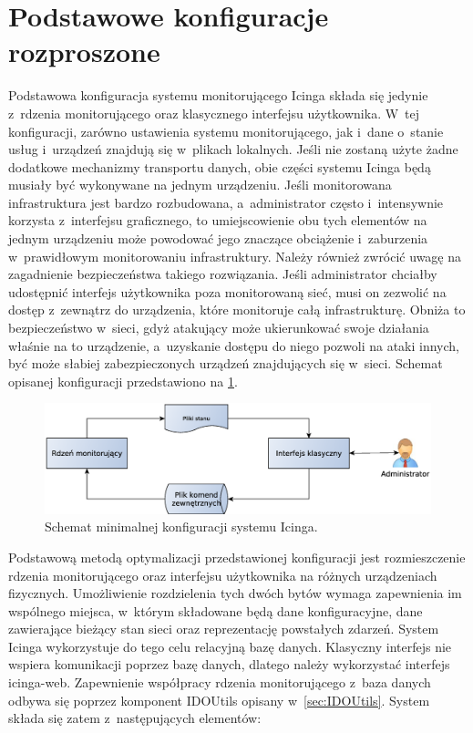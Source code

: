\section[Konfiguracje rozproszone][Podstawowe konfiguracje rozproszone]{Podstawowe konfiguracje rozproszone}

Podstawowa konfiguracja systemu monitorującego Icinga składa się
jedynie z~rdzenia monitorującego oraz klasycznego interfejsu
użytkownika. W~tej konfiguracji, zarówno ustawienia systemu
monitorującego, jak i~dane o~stanie usług i~urządzeń znajdują się
w~plikach lokalnych. Jeśli nie zostaną użyte żadne dodatkowe
mechanizmy transportu danych, obie części systemu Icinga będą musiały
być wykonywane na jednym urządzeniu. Jeśli monitorowana infrastruktura
jest bardzo rozbudowana, a~administrator często i~intensywnie korzysta
z~interfejsu graficznego, to umiejscowienie obu tych elementów na
jednym urządzeniu może powodować jego znaczące obciążenie i~zaburzenia
w~prawidłowym monitorowaniu infrastruktury. Należy również zwrócić
uwagę na zagadnienie bezpieczeństwa takiego rozwiązania. Jeśli
administrator chciałby udostępnić interfejs użytkownika poza
monitorowaną sieć, musi on zezwolić na dostęp z~zewnątrz do
urządzenia, które monitoruje całą infrastrukturę. Obniża to
bezpieczeństwo w~sieci, gdyż atakujący może ukierunkować swoje
działania właśnie na to urządzenie, a~uzyskanie dostępu do niego
pozwoli na ataki innych, być może słabiej zabezpieczonych urządzeń
znajdujących się w~sieci. Schemat opisanej konfiguracji przedstawiono
na \ref{fig:icingaMini}.

\begin{figure}[h]
  \caption{Schemat minimalnej konfiguracji systemu Icinga.}
  \label{fig:icingaMini}
\includegraphics[width=1\textwidth]{img/icingaMini}
\end{figure}

Podstawową metodą optymalizacji przedstawionej konfiguracji jest
rozmieszczenie rdzenia monitorującego oraz interfejsu użytkownika na
różnych urządzeniach fizycznych. Umożliwienie rozdzielenia tych dwóch
bytów wymaga zapewnienia im wspólnego miejsca, w~którym składowane
będą dane konfiguracyjne, dane zawierające bieżący stan sieci oraz
reprezentację powstałych zdarzeń. System Icinga wykorzystuje do tego
celu relacyjną bazę danych. Klasyczny interfejs nie wspiera
komunikacji poprzez bazę danych, dlatego należy wykorzystać interfejs
icinga-web. Zapewnienie współpracy rdzenia monitorującego z~baza
danych odbywa się poprzez komponent IDOUtils opisany
w~\ref{sec:IDOUtils}. System składa się zatem z~następujących
elementów:

